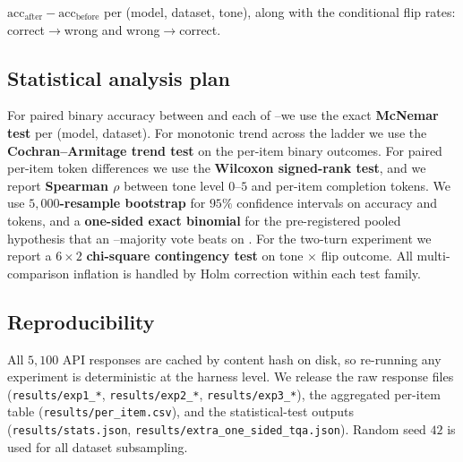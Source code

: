  $\text{acc}_{\text{after}} - \text{acc}_{\text{before}}$ per (model, dataset, tone), along with the conditional flip rates: correct$\rightarrow$wrong and wrong$\rightarrow$correct.

\subsection{Statistical analysis plan}
\label{sec:method:stats}

For paired binary accuracy between \Lz and each of \Lo--\Lfi we use the exact \textbf{McNemar test} per (model, dataset). For monotonic trend across the ladder we use the \textbf{Cochran--Armitage trend test} on the per-item binary outcomes. For paired per-item token differences we use the \textbf{Wilcoxon signed-rank test}, and we report \textbf{Spearman $\rho$} between tone level $0$--$5$ and per-item completion tokens. We use \textbf{$5{,}000$-resample bootstrap} for $95\%$ confidence intervals on accuracy and tokens, and a \textbf{one-sided exact binomial} for the pre-registered pooled hypothesis that an \Lo--\Lfi majority vote beats \Lz on \tqa. For the two-turn experiment we report a $6\times2$ \textbf{chi-square contingency test} on tone $\times$ flip outcome. All multi-comparison inflation is handled by Holm correction within each test family.

\subsection{Reproducibility}
\label{sec:method:repro}

All $5{,}100$ API responses are cached by content hash on disk, so re-running any experiment is deterministic at the harness level. We release the raw response files (\texttt{results/exp1\_*}, \texttt{results/exp2\_*}, \texttt{results/exp3\_*}), the aggregated per-item table (\texttt{results/per\_item.csv}), and the statistical-test outputs (\texttt{results/stats.json}, \texttt{results/extra\_one\_sided\_tqa.json}). Random seed $42$ is used for all dataset subsampling.
